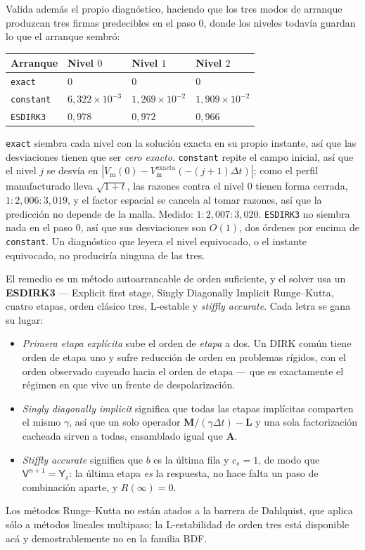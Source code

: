 \documentclass[11pt,a4paper]{article}
\newcommand{\code}[1]{\texttt{\small #1}}
\newcommand{\Vm}{V_{\text{m}}}
\newcommand{\Mmass}{\mathbf{M}}
\newcommand{\Lop}{\mathbf{L}}
\newcommand{\Aimp}{\mathbf{A}}
\begin{document}
Valida además el propio diagnóstico, haciendo que los tres modos de arranque produzcan tres
firmas predecibles en el paso $0$, donde los niveles todavía guardan lo que el arranque sembró:
\begin{center}
\begin{tabular}{@{}llll@{}}
\toprule
Arranque & Nivel $0$ & Nivel $1$ & Nivel $2$ \\
\midrule
\code{exact}    & $0$ & $0$ & $0$ \\
\code{constant} & $6{,}322\times10^{-3}$ & $1{,}269\times10^{-2}$ & $1{,}909\times10^{-2}$ \\
\code{ESDIRK3}  & $0{,}978$ & $0{,}972$ & $0{,}966$ \\
\bottomrule
\end{tabular}
\end{center}
\code{exact} siembra cada nivel con la solución exacta en su propio instante, así que las
desviaciones tienen que ser \emph{cero exacto}. \code{constant} repite el campo inicial, así que
el nivel $j$ se desvía en $|\Vm(0)-\Vm^{\text{exacta}}(-(j+1)\Delta t)|$; como el perfil
manufacturado lleva $\sqrt{1+t}$, las razones contra el nivel $0$ tienen forma cerrada,
$1:2{,}006:3{,}019$, y el factor espacial se cancela al tomar razones, así que la predicción no
depende de la malla. Medido: $1:2{,}007:3{,}020$. \code{ESDIRK3} no siembra nada en el paso $0$,
así que sus desviaciones son $O(1)$, dos órdenes por encima de \code{constant}. Un diagnóstico
que leyera el nivel equivocado, o el instante equivocado, no produciría ninguna de las tres.

El remedio es un método autoarrancable de orden suficiente, y el solver usa un
\textbf{ESDIRK3} --- Explicit first stage, Singly Diagonally Implicit Runge--Kutta, cuatro
etapas, orden clásico tres, L-estable y \emph{stiffly accurate}. Cada letra se gana su
lugar:
\begin{itemize}
  \item \emph{Primera etapa explícita} sube el orden de \emph{etapa} a dos. Un DIRK común
        tiene orden de etapa uno y sufre reducción de orden en problemas rígidos, con el
        orden observado cayendo hacia el orden de etapa --- que es exactamente el régimen
        en que vive un frente de despolarización.
  \item \emph{Singly diagonally implicit} significa que todas las etapas implícitas
        comparten el mismo $\gamma$, así que un solo operador
        $\Mmass/(\gamma\Delta t)-\Lop$ y una sola factorización cacheada sirven a todas,
        ensamblado igual que $\Aimp$.
  \item \emph{Stiffly accurate} significa que $b$ es la última fila y $c_s=1$, de modo que
        $\mathsf{V}^{n+1}=\mathsf{Y}_s$: la última etapa \emph{es} la respuesta, no hace
        falta un paso de combinación aparte, y $R(\infty)=0$.
\end{itemize}
Los métodos Runge--Kutta no están atados a la barrera de Dahlquist, que aplica sólo a
métodos lineales multipaso; la L-estabilidad de orden tres está disponible acá y
demostrablemente no en la familia BDF.
\end{document}
